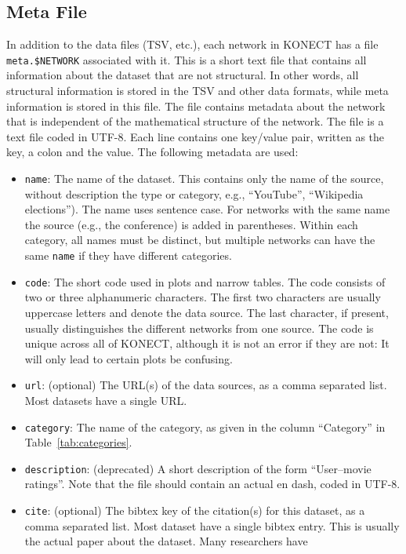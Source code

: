 \documentclass{article}
\begin{document}
\subsection{Meta File}
In addition to the data files (TSV, etc.), each network in KONECT has a
file \texttt{meta.\$NETWORK} associated with it.  This is a short text
file that contains all information about the dataset that are not
structural.  In other words, all structural information is stored in the
TSV and other data formats, while meta information is stored in this
file. 
The file contains metadata about the
network that is independent of the mathematical structure of the
network.  
The file is a text file coded in UTF-8.  Each line
contains one key/value pair, written as the key, a colon and the
value.  The following metadata are used:
\begin{itemize}
\item \texttt{name}: The name of the dataset.  This contains only the
  name of the source, without description the type or category,
  e.g., ``YouTube'', ``Wikipedia elections'').  The name uses
  sentence case.  For networks with the same name the source (e.g.,
  the conference) is added in parentheses.  Within each category,
  all names must be distinct, but multiple networks can have the same
  \texttt{name} if they have different categories. 
\item \texttt{code}: The short code used in plots and narrow
  tables.  The code consists of two or three alphanumeric characters.  The first
  two characters are usually uppercase letters and denote the data
  source.  The last character, if present, usually distinguishes
  the different networks from one source.  The code is unique across all
  of KONECT, although it is not an error if they are not:  It will only
  lead to certain plots be confusing. 
\item \texttt{url}: (optional) The URL(s) of the data sources, as a comma
  separated list.  Most datasets have a single URL.
\item \texttt{category}: The name of the category, as given in the
  column ``Category'' in Table~\ref{tab:categories}.
\item \texttt{description}: (deprecated) A short description of the form
  ``User–movie ratings''.  Note that the file should contain an
  actual en dash, coded in UTF-8.
\item \texttt{cite}: (optional) The bibtex key of the citation(s) for this dataset, as a
  comma separated list. Most dataset have a single bibtex entry.  This
  is usually the actual paper about the dataset.  Many researchers have

\end{itemize}
\end{document}
